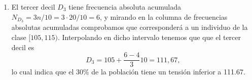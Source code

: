 {\begin{enumerate}
\begin{align*}
\bar{x} & = \frac{\sum x_in_i}{n}=\frac{2460}{20}=123,\\
s^2 & =\frac{\sum x_i^2n_i}{N}-\bar{x}^2= \frac{307600}{20}-123^2=251,\\
s & =\sqrt{251}=15.84.
\end{align*}

Por último calculamos el coeficiente de asimetría
\[
\begin{array}{|c|r|r|r|r|}
\hline
   X  & \multicolumn{1}{c|}{x_i} & \multicolumn{1}{c|}{n_i} & \multicolumn{1}{c|}{x_i-\bar{x}} & \multicolumn{1}{c|}{(x_i-\bar{x})^3n_i}\\
\hline\hline
  [95,105)  &  100  &   4       & -23 & -48668\\
\hline
 [105,115)  &  110 &    3       & -13 & -6591 \\
\hline
 [115,125) &  120 &    3       & -3 &  -81\\
\hline
 [125,135) &  130 &    4       & 7 & 1372 \\
\hline
 [135,145) &  140 &    5       & 17 & 24565 \\
\hline
 [145,155) &  150 &     1       & 27 & 19683\\
\hline
\hline
\textrm{Sumas} & & 20 &  & -9720\\
\hline
\end{array}
\]

\[
g_1=\frac{\sum (x-\bar{x})^3n_i/n}{s^3}=\frac{-9720/20}{15.84^3}=-0.12.
\]
Esto indica que la distribución es ligeramente asimétrica a la izquierda.

\item El tercer decil $D_3$ tiene frecuencia absoluta acumulada $N_{D_3}=3n/10=3\cdot 20/10=6$, y mirando en la columna de frecuencias absolutas acumuladas comprobamos que corresponderá a un individuo de la clase $[105,115)$. Interpolando en dicho intervalo tenemos que que el tercer decil es
\[ D_3=105+\frac{6-4}{3}10=111,67,
\]
lo cual indica que  el 30\% de la población tiene un tensión inferior a 111.67.


\end{enumerate}}
